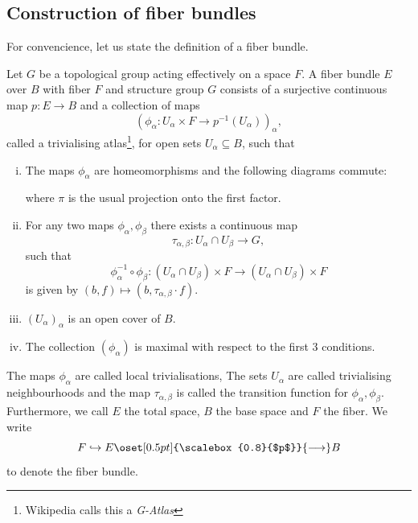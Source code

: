 \subsection{Construction of fiber bundles}

For convencience, let us state the definition of a fiber bundle.

\begin{definition}
    \label{def:fiber_bundle}
    Let $G$ be a topological group acting effectively on a space $F$. A fiber bundle $E$ over $B$ with fiber $F$ and structure group $G$ consists of a surjective continuous map $p \colon E \to B$ and a collection of maps 
    \[
    (\phi_\alpha \colon U_\alpha \times F \to p^{-1}(U_\alpha))_\alpha,
    \]
    called a trivialising atlas\footnote{Wikipedia calls this a \textit{G-Atlas}}, for open sets $U_\alpha \subseteq B$, such that 
    \begin{enumerate}[(i)]
        \item The maps $\phi_\alpha$ are homeomorphisms and the following diagrams commute:
        \begin{center}
        \end{center}
        where $\pi$ is the usual projection onto the first factor.
        \item For any two maps $\phi_\alpha, \phi_\beta$ there exists a continuous map
        \[
        \tau_{\alpha,\beta} \colon U_\alpha \cap U_\beta \to G,
        \]
        such that
        \[
        \phi_\alpha^{-1} \circ \phi_\beta \colon (U_\alpha \cap U_\beta) \times F \to (U_\alpha \cap U_\beta) \times F
        \]
        is given by $(b,f) \mapsto (b,\tau_{\alpha,\beta} \cdot f)$.
        \item $(U_\alpha)_\alpha$ is an open cover of $B$.
        \item The collection $(\phi_\alpha)$ is maximal with respect to the first 3 conditions.
    \end{enumerate}
    The maps $\phi_\alpha$ are called local trivialisations,  The sets $U_\alpha$ are called trivialising neighbourhoods and the map $\tau_{\alpha,\beta}$ is called the transition function for $\phi_\alpha,\phi_\beta$. Furthermore, we call $E$ the total space, $B$ the base space and $F$ the fiber. We write
    \[
    F \hookrightarrow E \oset[0.5pt]{\scalebox{0.8}{$p$}}{\longrightarrow} B
    \]
    to denote the fiber bundle.
\end{definition}

